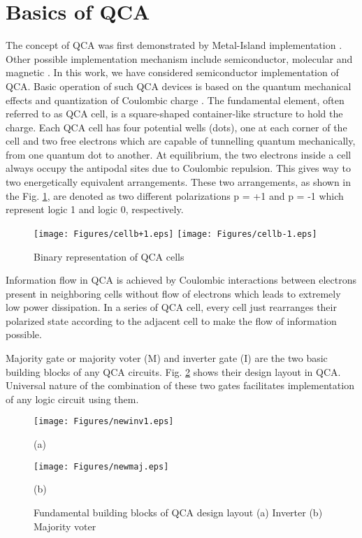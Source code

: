 \documentclass[conference]{IEEEtran}
\begin{document}
\section{Basics of QCA}
\label{sec:basicsQCA}
The concept of QCA was first demonstrated by Metal-Island implementation \cite{Swartzlander_BookChap2014}.
Other possible implementation mechanism include semiconductor, molecular and magnetic \cite{Swartzlander_BookChap2014}.
In this work, we have considered semiconductor implementation of QCA.  
Basic operation of such QCA devices is based on the quantum mechanical effects and quantization of Coulombic charge \cite{lent_tnano1993}.
The fundamental element, often referred to as QCA cell, is a square-shaped container-like structure to hold the charge. Each QCA cell has four potential wells (dots), one at each corner of the cell and two free electrons which are capable of tunnelling quantum mechanically, from one quantum dot to another. At equilibrium, the two electrons inside a cell always occupy the antipodal sites due to Coulombic repulsion. This gives way to two energetically equivalent arrangements. These two arrangements, as shown in the Fig. \ref{fig:Polarity}, are denoted as two different polarizations p = +1 and p = -1 which represent logic 1 and logic 0, respectively. 
\begin{figure}[ht!]
\centering
\texttt{[image: Figures/cellb+1.eps]}
\hspace{1 cm} 
\texttt{[image: Figures/cellb-1.eps]}
\caption{\small Binary representation of QCA cells}
\label{fig:Polarity}
\end{figure}
Information flow in QCA is achieved by Coulombic interactions between electrons present in neighboring cells without flow of electrons which leads to extremely low power dissipation.
In a series of QCA cell, every cell just rearranges their polarized state according to the adjacent cell to make the flow of information possible.
 
Majority gate or majority voter (M) and inverter gate (I)\cite{lent_jap1994} are the two basic building blocks of any QCA circuits. Fig. \ref{fig:Gates} shows their design layout in QCA.
Universal nature of the combination of these two gates facilitates implementation of any logic circuit using them.
\begin{figure}[ht]
\center
\begin{minipage}[b]{0.45\linewidth}
\centering
\texttt{[image: Figures/newinv1.eps]}
\centerline{(a)}
\end{minipage}
\hspace{0.8cm}
\begin{minipage}[b]{0.21\linewidth}
\centering
\texttt{[image: Figures/newmaj.eps]}
\centerline{(b)}
\end{minipage}
\caption{\small Fundamental building blocks of QCA design layout (a) Inverter  (b) Majority voter}
\label{fig:Gates}
\end{figure}
\end{document}
